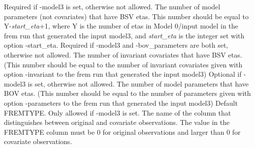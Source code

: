 \begin{optionlist}
\nextopt
{}
Required if -model3 is set, otherwise not allowed. The number of model parameters (not covariates) that have BSV etas. This number should be equal to Y-\emph{start\_eta}+1, where Y is the number of etas in Model 0/input model in the frem run that generated the input model3, and 
\emph{start\_eta} is the integer set with option -start\_eta. 
\nextopt
{}
Required if -model3 and -bov\_parameters are both set, otherwise not allowed. The number of invariant covariates that have BSV etas. (This number should be equal to the number of invariant covariates given with option -invariant to the frem run that generated the input model3) 
\nextopt
{}
Optional if -model3 is set, otherwise not allowed. The number of model parameters that have BOV etas. (This number should be equal to the number of parameters given with option -parameters to the frem run that generated the input model3)  
\nextopt
{}
Default FREMTYPE. Only allowed if -model3 is set. The name of the column that distinguishes between original and covariate observations. The value in the FREMTYPE column must be 0 for original observations and larger than 0 for covariate observations.  
\nextopt
\end{optionlist}

